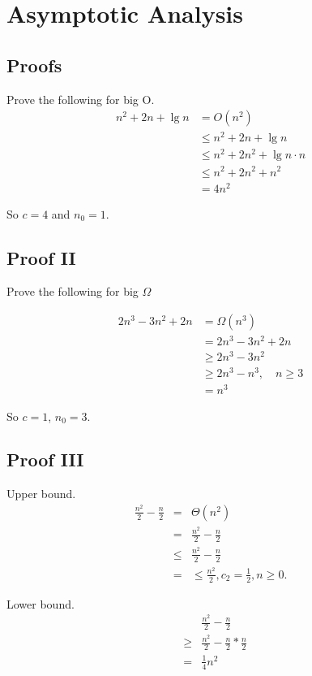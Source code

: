 \documentclass{article}
\begin{document}
\setcounter{section}{1}
\section{Asymptotic Analysis}

\subsection{Proofs}
Prove the following for big O.
\begin{align}
n^2 + 2n + \lg n &= O(n^2) \\
&\leq n^2 + 2n + \lg n \\
&\leq n^2 + 2n^2 + \lg n \cdot n \\
&\leq n^2 + 2n^2 + n^2 \\
&= 4 n^2
\end{align}

So $c = 4$ and $n_0 = 1$.

\subsection{Proof II}
Prove the following for big $\Omega$

\begin{align}
2n^3 - 3n^2 + 2n &= \Omega (n^3) \\
&= 2n^3 - 3n^2 + 2n \\
&\geq 2n^3 - 3n^2 \\
&\geq 2n^3 - n^3, \quad n \geq 3 \\
&= n^3
\end{align}

So $c = 1$, $n_0 = 3$.

\subsection{Proof III}
Upper bound.
\begin{eqnarray}
\frac{n^2}{2} - \frac{n}{2} & = & \Theta (n^2) \\
& = & \frac{n^2}{2} - \frac{n}{2} \\
& \leq & \frac{n^2}{2} - \frac{n}{2} \\
& = & \leq \frac{n^2}{2}, c_2 = \frac{1}{2}, n \geq 0.
\end{eqnarray}

Lower bound.
\begin{eqnarray}
& & \frac{n^2}{2} - \frac{n}{2} \\
& \geq & \frac{n^2}{2} - \frac{n}{2} * \frac{n}{2} \\
& = & \frac{1}{4}n^2
\end{eqnarray}
\end{document}

